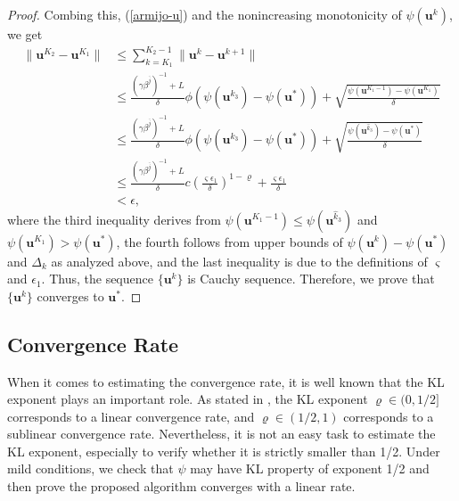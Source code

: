 \documentclass{article}
\numberwithin{equation}{section}
\begin{document}
\begin{proof}
Combing this, (\ref{armijo-u}) and the nonincreasing monotonicity of $\psi(\mathbf{u}^k)$, we get
\begin{equation}
	\begin{aligned}
		\|\mathbf{u}^{K_2}-\mathbf{u}^{K_1}\|&\leq\sum_{k=K_1}^{K_2-1}\|\mathbf{u}^k-\mathbf{u}^{k+1}\|\\
		&\leq
		\frac{(\gamma\beta^{\bar{j}})^{-1}+L}{\delta}\phi(\psi(\mathbf{u}^{\hat{k}_3})-\psi(\mathbf{u}^*))
		+\sqrt{\frac{\psi(\mathbf{u}^{K_1-1})-\psi(\mathbf{u}^{K_1})}{\delta}}\\
		&\leq
		\frac{(\gamma\beta^{\bar{j}})^{-1}+L}{\delta}\phi(\psi(\mathbf{u}^{\hat{k}_3})-\psi(\mathbf{u}^*))
		+\sqrt{\frac{\psi(\mathbf{u}^{\hat{k}_3})-\psi(\mathbf{u}^*)}{\delta}}\\
		&\leq\frac{(\gamma\beta^{\bar{j}})^{-1}+L}{\delta}c(\frac{\varsigma\epsilon_1}{\delta})^{1-\varrho}+\frac{\varsigma\epsilon_1}{\delta}\\
		&<\epsilon,
	\end{aligned}\nonumber\end{equation}
where the third inequality derives from $\psi(\mathbf{u}^{K_1-1})\leq\psi(\mathbf{u}^{\hat{k}_3})$ and $\psi(\mathbf{u}^{K_1})>\psi(\mathbf{u}^*)$, the fourth follows from upper bounds of $\psi(\mathbf{u}^k)-\psi(\mathbf{u}^*)$ and $\Delta_k$ as analyzed above, and the last inequality is due to the definitions of $\varsigma$ and $\epsilon_1$. Thus, the sequence $\{\mathbf{u}^k\}$ is Cauchy sequence. Therefore, we prove that  $\{\mathbf{u}^k\}$ converges to $\mathbf{u}^*$. 
\end{proof}

\subsection{Convergence Rate}\label{s5.3}
When it comes to estimating the convergence rate, it is well known that the KL exponent plays an important role. As stated in \cite{attouch2009convergence}, the KL exponent $\varrho\in(0,1/2]$ corresponds to a linear convergence rate, and $\varrho\in(1/2,1)$   corresponds to a sublinear convergence rate. Nevertheless, it is not an easy task to estimate the KL exponent, especially to verify whether it is strictly smaller than 1/2. Under mild conditions, we check that $\psi$ may have KL property of exponent 1/2 and then prove the proposed algorithm converges with a linear rate.
\end{document}

